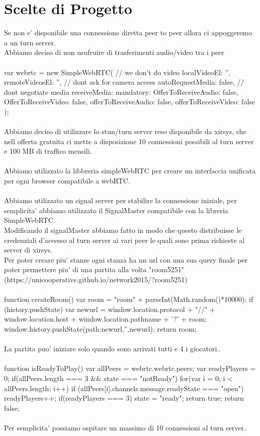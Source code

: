 ﻿\documentclass[11pt, a4paper, titlepage, block]{article}
\begin{document}
\section{Scelte di Progetto}
  Se non e' disponibile una connessione diretta peer to peer allora ci appoggeremo a un turn server.
	\\
	Abbiamo deciso di non usufruire di trasferimenti audio/video tra i peer
	\\
	\\
	var webrtc = new SimpleWebRTC({
		// we don't do video
		localVideoEl: '',
		remoteVideosEl: '',
		// dont ask for camera access
		autoRequestMedia: false,
		// dont negotiate media
		receiveMedia: {
			mandatory: {
				OfferToReceiveAudio: false,
				OfferToReceiveVideo: false,
				offerToReceiveAudio: false,
				offerToReceiveVideo: false
			}
		}
	});
	\\
  \\
	Abbiamo deciso di utilizzare lo stun/turn server reso disponibile da xirsys, che nell offerta gratuita ci mette a disposizione 10 connessioni possibili al turn server e 100 MB di traffico mensili.\\
	\\
	Abbiamo utilizzato la libbreria simpleWebRTC per creare un interfaccia unificata per ogni browser compatibile a webRTC.\\
	\\
  Abbiamo utilizzato un signal server per stabilire la connessione iniziale, per semplicita' abbiamo utilizzato il SignalMaster compatibile con la libreria SimpleWebRTC.
	\\
 	Modificando il signalMaster abbiamo fatto in modo che questo distribuisse le credenziali d'accesso al turn server ai vari peer le quali sono prima richieste al server di xirsys.
	\\
	Per poter creare piu' stanze ogni stanza ha un url con una sua query finale per poter permettere piu' di una partita alla volta "room5251"\\ (https://unicooperative.github.io/network2015/?room5251)
	\\
	\\
	function createRoom() {
		var room = "room" + parseInt(Math.random()*10000);
		if (history.pushState) {
			var newurl = window.location.protocol + "//" + window.location.host + window.location.pathname + '?' + room;
			window.history.pushState({path:newurl},'',newurl);
		}
		return room;
	}
	\\
	\\
	La partita puo' iniziare solo quando sono arrivati tutti e 4 i giocatori..
	\\
	\\
	function isReadyToPlay() {
		var allPeers = webrtc.webrtc.peers;
		var readyPlayers = 0;
		if(allPeers.length === 3 && state === "notReady"){
			for(var i = 0; i < allPeers.length; i++) {
				if (allPeers[i].channels.message.readyState === "open") {
					readyPlayers++;
				}
			}
			if(readyPlayers === 3) {
				state = "ready";
				return true;
			}
		}
		return false;
	}
	\\
	\\
	Per semplicita' possiamo ospitare un massimo di 10 connessioni al turn server.
	\\
\end{document}
